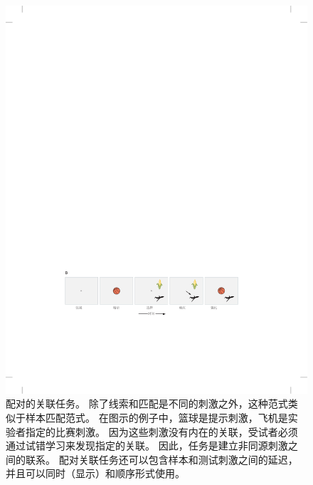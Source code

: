 \begin{figure}[htbp]
	\centering
	\includegraphics[width=0.95\linewidth]{chap24/fig_24_10_B}
	\caption{配对的关联任务。
		除了线索和匹配是不同的刺激之外，这种范式类似于样本匹配范式。
		在图示的例子中，篮球是提示刺激，飞机是实验者指定的比赛刺激。
		因为这些刺激没有内在的关联，受试者必须通过试错学习来发现指定的关联。
		因此，任务是建立非同源刺激之间的联系。
		配对关联任务还可以包含样本和测试刺激之间的延迟，并且可以同时（显示）和顺序形式使用。}
	\label{fig:24_10_b}
\end{figure}


